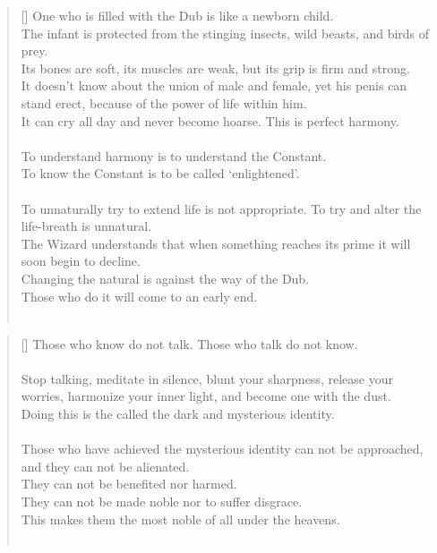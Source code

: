 \documentclass{article}
\begin{document}
\settowidth{\versewidth}{The Wizard leads byemptying people’s minds, filling their bellies, weakening their am- bitions, and making them become strong}
\begin{verse}[\versewidth]
One who is filled with the Dub is like a newborn child.\\
The infant is protected from the stinging insects, wild beasts, and birds of prey.\\
Its bones are soft, its muscles are weak, but its grip is firm and strong.\\
It doesn't know about the union of male and female, yet his penis can stand erect, because of the power of life within him.\\
It can cry all day and never become hoarse. 
This is perfect harmony.\\
\hfill\\
To understand harmony is to understand the Constant.\\
To know the Constant is to be called `enlightened'.\\
\hfill\\
To unnaturally try to extend life is not appropriate. 
To try and alter the life-breath is unnatural.\\
The Wizard understands that when something reaches its prime it will soon begin to decline.\\
Changing the natural is against the way of the Dub.\\
Those who do it will come to an early end.\\
\hfill\\
\end{verse}

\settowidth{\versewidth}{The Wizard leads byemptying people’s minds, filling their bellies, weakening their am- bitions, and making them become strong}
\begin{verse}[\versewidth]
Those who know do not talk. 
Those who talk do not know.\\
\hfill\\
Stop talking, meditate in silence, blunt your sharpness, release your worries, harmonize your inner light, and become one with the dust.\\
Doing this is the called the dark and mysterious identity.\\
\hfill\\
Those who have achieved the mysterious identity can not be approached, and they can not be alienated.\\
They can not be benefited nor harmed.\\
They can not be made noble nor to suffer disgrace.\\
This makes them the most noble of all under the heavens.\\
\hfill\\
\end{verse}
\end{document}
